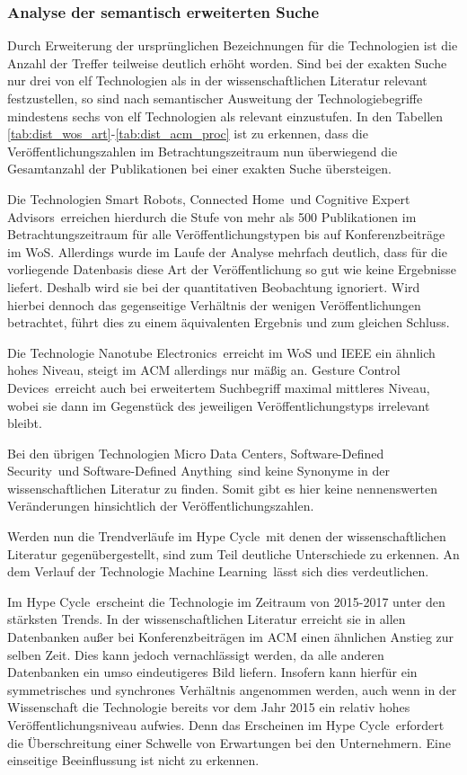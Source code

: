 \subsubsection{Analyse der semantisch erweiterten Suche}
Durch Erweiterung der ursprünglichen Bezeichnungen für die Technologien ist die Anzahl der Treffer teilweise deutlich erhöht worden. Sind bei der exakten Suche nur drei von elf Technologien als in der wissenschaftlichen Literatur relevant festzustellen, so sind nach semantischer Ausweitung der Technologiebegriffe mindestens sechs von elf Technologien als relevant einzustufen. In den Tabellen \ref{tab:dist_wos_art}-\ref{tab:dist_acm_proc} ist zu erkennen, dass die Veröffentlichungszahlen im Betrachtungszeitraum nun überwiegend die Gesamtanzahl der Publikationen bei einer exakten Suche übersteigen.

Die Technologien \glqq Smart Robots\grqq, \glqq Connected Home\grqq~und \glqq Cognitive Expert Advisors\grqq~erreichen hierdurch die Stufe von mehr als 500 Publikationen im Betrachtungszeitraum für alle Veröffentlichungstypen bis auf Konferenzbeiträge im \ac{WoS}. Allerdings wurde im Laufe der Analyse mehrfach deutlich, dass für die vorliegende Datenbasis diese Art der Veröffentlichung so gut wie keine Ergebnisse liefert. Deshalb wird sie bei der quantitativen Beobachtung ignoriert. Wird hierbei dennoch das gegenseitige Verhältnis der wenigen Veröffentlichungen betrachtet, führt dies zu einem äquivalenten Ergebnis und zum gleichen Schluss.

Die Technologie \glqq Nanotube Electronics\grqq~erreicht im \ac{WoS} und \ac{IEEE} ein ähnlich hohes Niveau, steigt im \ac{ACM} allerdings nur mäßig an. \glqq Gesture Control Devices\grqq~erreicht auch bei erweitertem Suchbegriff maximal mittleres Niveau, wobei sie dann im Gegenstück des jeweiligen Veröffentlichungstyps irrelevant bleibt.

Bei den übrigen Technologien \glqq Micro Data Centers\grqq, \glqq Software-Defined Security\grqq~und \glqq Software-Defined Anything\grqq~sind keine Synonyme in der wissenschaftlichen Literatur zu finden. Somit gibt es hier keine nennenswerten Veränderungen hinsichtlich der Veröffentlichungszahlen.

Werden nun die Trendverläufe im \glqq Hype Cycle\grqq~mit denen der wissenschaftlichen Literatur gegenübergestellt, sind zum Teil deutliche Unterschiede zu erkennen. An dem Verlauf der Technologie \glqq Machine Learning\grqq~lässt sich dies verdeutlichen.

Im \glqq Hype Cycle\grqq~erscheint die Technologie im Zeitraum von 2015-2017 unter den stärksten Trends. In der wissenschaftlichen Literatur erreicht sie in allen Datenbanken außer bei Konferenzbeiträgen im \ac{ACM} einen ähnlichen Anstieg zur selben Zeit. Dies kann jedoch vernachlässigt werden, da alle anderen Datenbanken ein umso eindeutigeres Bild liefern. Insofern kann hierfür ein symmetrisches und synchrones Verhältnis angenommen werden, auch wenn in der Wissenschaft die Technologie bereits vor dem Jahr 2015 ein relativ hohes Veröffentlichungsniveau aufwies. Denn das Erscheinen im \glqq Hype Cycle\grqq~erfordert die Überschreitung einer Schwelle von Erwartungen bei den Unternehmern. Eine einseitige Beeinflussung ist nicht zu erkennen.

